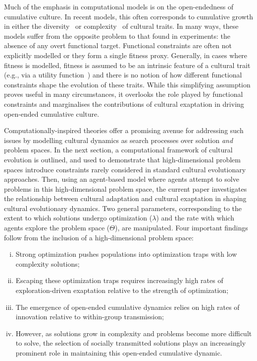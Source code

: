 \documentclass{article}
\begin{document}
Much of the emphasis in computational models is on the open-endedness of cumulative culture. In recent models, this often corresponds to cumulative growth in either the diversity~\cite{mesoudi2011variable,kolodny2015evolution,creanza2017greater} or complexity~\cite{enquist2011modelling,lewis2012transmission,derex2018divide} of cultural traits. In many ways, these models suffer from the opposite problem to that found in experiments: the absence of any overt functional target. Functional constraints are often not explicitly modelled or they form a single fitness proxy. Generally, in cases where fitness is modelled, fitness is assumed to be an intrinsic feature of a cultural trait (e.g., via a utility function~\cite{lewis2012transmission}) and there is no notion of how different functional constraints shape the evolution of these traits. While this simplifying assumption proves useful in many circumstances, it overlooks the role played by functional constraints and marginalises the contributions of cultural exaptation in driving open-ended cumulative culture.

Computationally-inspired theories offer a promising avenue for addressing such issues by modelling cultural dynamics as search processes over solution {\em and} problem spaces. In the next section, a computational framework of cultural evolution is outlined, and used to demonstrate that high-dimensional problem spaces introduce constraints rarely considered in standard cultural evolutionary approaches. Then, using an agent-based model where agents attempt to solve problems in this high-dimensional problem space, the current paper investigates the relationship between cultural adaptation and cultural exaptation in shaping cultural evolutionary dynamics. Two general parameters, corresponding to the extent to which solutions undergo optimization ($\lambda$) and the rate with which agents explore the problem space ($\Theta$), are manipulated. Four important findings follow from the inclusion of a high-dimensional problem space:

\begin{enumerate}[(i)]
    \item Strong optimization pushes populations into optimization traps with low complexity solutions;
    \sloppy
    \item Escaping these optimization traps requires increasingly high rates of exploration-driven exaptation relative to the strength of optimization;
    \item The emergence of open-ended cumulative dynamics relies on high rates of innovation relative to within-group transmission;
    \item However, as solutions grow in complexity and problems become more difficult to solve, the selection of socially transmitted solutions plays an increasingly prominent role in maintaining this open-ended cumulative dynamic.
\end{enumerate}
\end{document}
